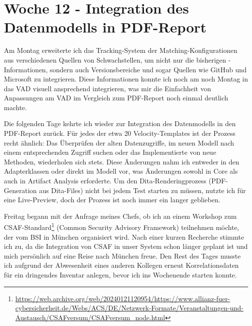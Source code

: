 \section{Woche 12 - Integration des Datenmodells in PDF-Report} \label{sec:bericht-wo-12}


\lweekdaymarginpar{\weekdayMondayLong}

Am Montag erweiterte ich das Tracking-System der Matching-Konfigurationen aus verschiedenen Quellen von Schwachstellen, um nicht nur die bisherigen -Informationen, sondern auch Versionsbereiche und sogar Quellen wie GitHub und Microsoft zu integrieren.
Diese Informationen konnte ich noch am noch Montag in das VAD visuell ansprechend integrieren, was mir die Einfachheit von Anpassungen am VAD im Vergleich zum PDF-Report noch einmal deutlich machte.

\sweekdaymarginpar{\weekdayTuesdayShort, \weekdayWednesdayShort, \weekdayThursdayShort}

Die folgenden Tage kehrte ich wieder zur Integration des Datenmodells in den PDF-Report zurück.
Für jedes der etwa 20 Velocity-Templates ist der Prozess recht ähnlich:
Das Überprüfen der alten Datenzugriffe, im neuen Modell nach einem entsprechenden Zugriff suchen oder das Implementierte von neue Methoden, wiederholen sich stets.
Diese Änderungen nahm ich entweder in den Adapterklassen oder direkt im Modell vor, was Änderungen sowohl in Core als auch in Artifact Analysis erforderte.
Um den Dita-Renderingprozess (PDF-Generation aus Dita-Files) nicht bei jedem Test starten zu müssen, nutzte ich  für eine Live-Preview, doch der Prozess ist noch immer ein langer geblieben.

\sweekdaymarginpar{\weekdayFridayLong}

Freitag begann mit der Anfrage meines Chefs, ob ich an einem Workshop zum CSAF-Standard\footnote{\url{https://web.archive.org/web/20240121120954/https://www.allianz-fuer-cybersicherheit.de/Webs/ACS/DE/Netzwerk-Formate/Veranstaltungen-und-Austausch/CSAFversum/CSAFversum_node.html}} (Common Security Advisory Framework) teilnehmen möchte, der vom BSI in München organisiert wird.
Nach einer kurzen Recherche stimmte ich zu, da die Integration von CSAF in unser System schon länger geplant ist und mich persönlich auf eine Reise nach München freue.
Den Rest des Tages musste ich aufgrund der Abwesenheit eines anderen Kollegen erneut Korrelationsdaten für ein dringendes Inventar anlegen, bevor ich ins Wochenende starten konnte.
